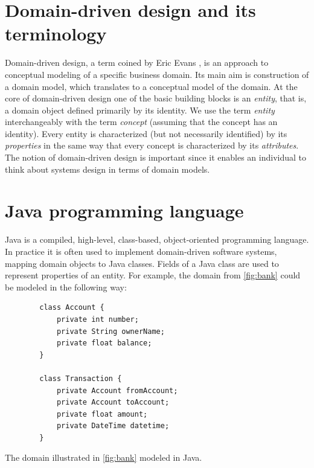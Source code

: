 %

\section{Domain-driven design and its terminology}
Domain-driven design, a term coined by Eric Evans \cite{ddd}, is an approach to conceptual modeling of a specific business domain.
Its main aim is construction of a domain model, which translates to a conceptual model of the domain.
At the core of domain-driven design one of the basic building blocks is an \textit{entity}, that is, a domain object defined primarily by its identity.
We use the term \textit{entity} interchangeably with the term \textit{concept} (assuming that the concept has an identity). 
Every entity is characterized (but not necessarily identified) by its \textit{properties} in the same way that every concept is characterized by its \textit{attributes}.
The notion of domain-driven design is important since it enables an individual to think about systems design in terms of domain models.

\section{Java programming language}
Java \cite{java} is a compiled, high-level, class-based, object-oriented programming language.
In practice it is often used to implement domain-driven software systems, mapping domain objects to Java classes.
Fields of a Java class are used to represent properties of an entity.
For example, the domain from \ref{fig:bank} could be modeled in the following way:

\begin{listing}[H]
    \begin{verbatim}
        class Account {
            private int number;
            private String ownerName;
            private float balance;
        }

        class Transaction {
            private Account fromAccount;
            private Account toAccount;
            private float amount;
            private DateTime datetime;
        }
    \end{verbatim}
    \caption{The domain illustrated in \ref{fig:bank} modeled in Java.}
    \label{lst:bank}
\end{listing}

